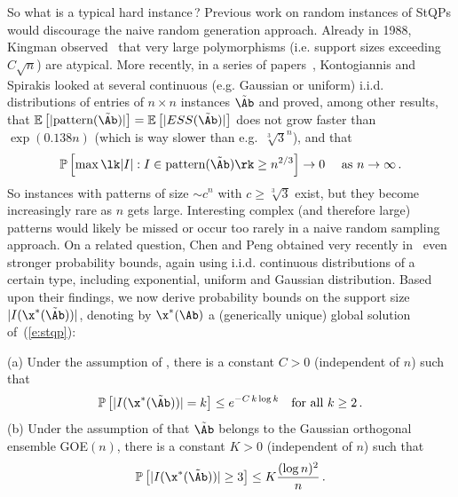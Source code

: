 \documentclass[moor]{informs3}              %
\def\reff#1{(\ref{#1})}
\def\EEE{\mathbb{E}}
\def\PPP{\mathbb{P}}
\def\cowe#1{{#1}} %
\def\coma#1{{#1}}
\begin{document}
So what is a typical hard instance\,? Previous work on random instances of StQPs would discourage the naive random generation \coma{approach.
Already in 1988, Kingman observed~\cite{King88a} that very large polymorphisms (i.e. support sizes exceeding $C\sqrt n$) are atypical. More recently, in} a series of papers~\cite{Kont05,Kont09,Kont10}, Kontogiannis and Spirakis looked at several continuous (e.g. Gaussian or uniform) i.i.d. distributions of entries of $n\times n$ instances
$\tilde \Ab$ and proved, among other results, that $\EEE \left [|\textup{pattern}(\tilde \Ab)|\right ] = \EEE \left [|ESS(\tilde \Ab)|\right ]$ does not grow faster than $\exp(0.138n)$ (which is way slower than e.g.~$\sqrt[3]{3}^n$),
and that
$$\PPP \left [\max \lk |I| : I \in  \textup{pattern}(\tilde \Ab)\rk \ge n^{2/3} \right ] \to 0 \quad\mbox{ as }n\to\infty\,. $$
So instances with patterns of size $\sim c^n$ with $c\ge\sqrt[3]{3}$ exist, but they become increasingly rare as $n$ gets large. Interesting complex (and therefore large) patterns would likely be missed or occur too rarely in a naive random sampling approach. On a related question, Chen and Peng obtained very recently in~\cite{Chen15a,Chen13} even stronger probability bounds, again using i.i.d. continuous distributions of a certain type, including exponential, uniform and Gaussian distribution. \coma{Based upon their findings, we now derive probability bounds on the support size $|I(\x^*(\tilde \Ab))|$,}  denoting by $\x^*(\Ab)$ a (generically unique) global solution of~\reff{e:stqp}:

\coma{\begin{prop}
(a) Under the assumption of \cowe{\cite[Thm 5]{Chen15a}}, there is a constant $C>0$ (independent of $n$) such that
$$\PPP \left [  |I(\x^*(\tilde \Ab))| =k \right ]\le e^{-C\,k\log k} \quad\mbox{for all }k\ge2\, .$$
(b) Under the assumption of \cowe{\cite[Thm 9]{Chen15a} that $\tilde\Ab$ belongs to the Gaussian orthogonal ensemble GOE$(n)$,} there is a constant $K>0$ (independent of $n$) such that
$$\PPP \left [  |I(\x^*(\tilde \Ab))| \ge 3 \right ]\le K\frac{(\log n)^2}n\, .$$
\end{prop}}
\end{document}

